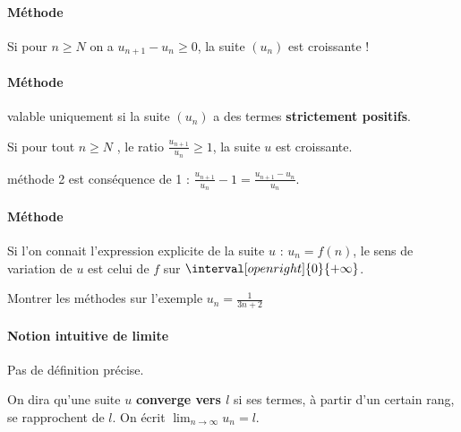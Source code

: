 \documentclass[main.tex]{subfiles}
\begin{document}
\paragraph{Méthode }  
\noindent Si pour $n\geqslant N$ on a $u_{n+1}-u_n\geqslant 0$, la suite $(u_n)$ est croissante ! 

\paragraph{Méthode } valable uniquement si la suite $(u_n)$ a des termes \textbf{strictement positifs}.

\noindent Si pour tout $n\geqslant N$ , le ratio $\frac{u_{n+1}}{u_n}\geqslant 1$, la suite $u$ est croissante.

\begin{remark} méthode 2 est conséquence de  1 : $\frac{u_{n+1}}{u_n}-  1=\frac{u_{n+1}-u_n}{u_n}$. 
	
\end{remark} 
\paragraph{Méthode } Si l'on connait l'expression explicite de la suite $u$ : $u_n=f(n)$, le sens de variation de $u$ est celui  de $f$ sur $\interval[open right]{0}{+\infty}$.
\begin{example}Montrer les méthodes sur l'exemple $u_n=\frac{1}{3n+2}$
	\end{example}
\paragraph{Notion intuitive de limite} Pas de définition précise.

 On dira qu'une suite $u$ \textbf{converge vers $l$} si ses termes, à partir d'un certain rang, se rapprochent de $l$. On écrit $\lim_{n\to\infty}u_n=l$.
\end{document}
